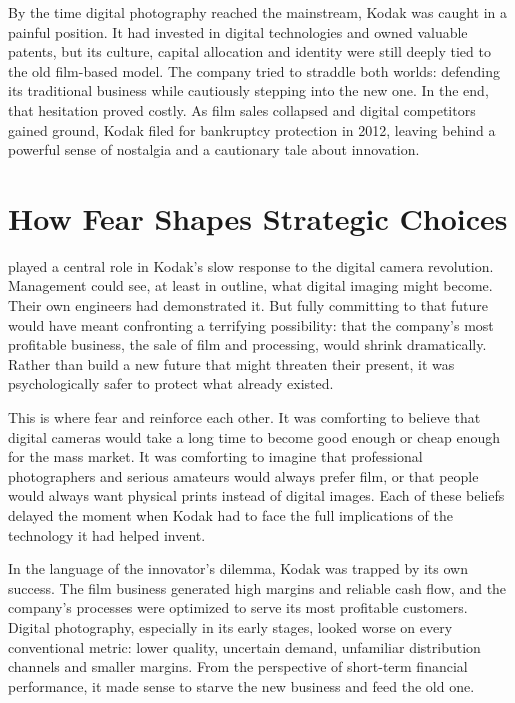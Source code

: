By the time digital photography reached the mainstream, Kodak was caught in a painful position. It had invested in digital technologies and owned valuable patents, but its culture, capital allocation and identity were still deeply tied to the old film-based model. The company tried to straddle both worlds: defending its traditional business while cautiously stepping into the new one. In the end, that hesitation proved costly. As film sales collapsed and digital competitors gained ground, Kodak filed for bankruptcy protection in 2012, leaving behind a powerful sense of nostalgia and a cautionary tale about innovation.

\section{How Fear Shapes Strategic Choices}

  played a central role in Kodak’s slow response to the digital camera revolution. Management could see, at least in outline, what digital imaging might become. Their own engineers had demonstrated it. But fully committing to that future would have meant confronting a terrifying possibility: that the company’s most profitable business, the sale of film and processing, would shrink dramatically. Rather than build a new future that might threaten their present, it was psychologically safer to protect what already existed.

This is where fear and   reinforce each other. It was comforting to believe that digital cameras would take a long time to become good enough or cheap enough for the mass market. It was comforting to imagine that professional photographers and serious amateurs would always prefer film, or that people would always want physical prints instead of digital images. Each of these beliefs delayed the moment when Kodak had to face the full implications of the technology it had helped invent.

In the language of the innovator's dilemma, Kodak was trapped by its own success. The film business generated high margins and reliable cash flow, and the company's processes were optimized to serve its most profitable customers. Digital photography, especially in its early stages, looked worse on every conventional metric: lower quality, uncertain demand, unfamiliar distribution channels and smaller margins. From the perspective of short-term financial performance, it made sense to starve the new business and feed the old one.

